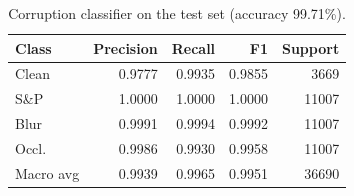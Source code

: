 \begin{table}[t]\centering\caption{Corruption classifier on the test set (accuracy 99.71\%).}\label{tab:t2clf}
\begin{tabular}{lrrrr}\toprule
Class & Precision & Recall & F1 & Support\\ \midrule
Clean & 0.9777 & 0.9935 & 0.9855 & 3669 \\
S\&P & 1.0000 & 1.0000 & 1.0000 & 11007 \\
Blur & 0.9991 & 0.9994 & 0.9992 & 11007 \\
Occl. & 0.9986 & 0.9930 & 0.9958 & 11007 \\
Macro avg & 0.9939 & 0.9965 & 0.9951 & 36690 \\
\bottomrule\end{tabular}\end{table}
